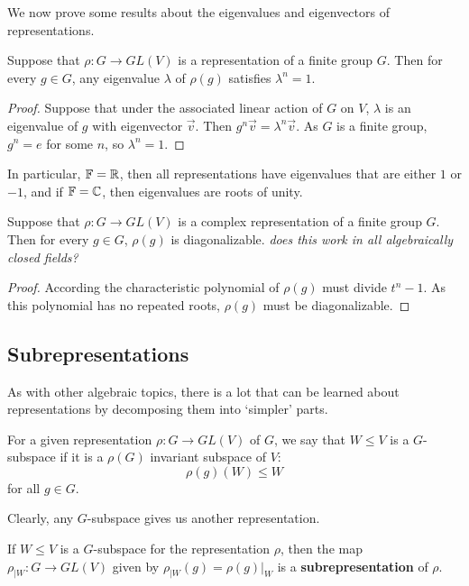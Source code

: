 \documentclass[a4paper]{article}
\begin{document}
We now prove some results about the eigenvalues and eigenvectors of representations.

\begin{lemma}
    Suppose that $\rho : G \to GL(V)$ is a representation of a finite group $G$. Then for every $g \in G$, any eigenvalue $\lambda$ of $\rho(g)$ satisfies $\lambda^n = 1$.
\end{lemma} 

\begin{proof}
    Suppose that under the associated linear action of $G$ on $V$, $\lambda$ is an eigenvalue of $g$ with eigenvector $\vec{v}$. Then $g^n\vec{v} = \lambda^n \vec{v}$. As $G$ is a finite group, $g^n = e$ for some $n$, so $\lambda^n = 1$.
\end{proof}
In particular, $\mathbb{F} = \mathbb{R}$, then all representations have eigenvalues that are either $1$ or $-1$, and if $\mathbb{F} = \mathbb{C}$, then eigenvalues are roots of unity.

\begin{cor}
    Suppose that $\rho : G \to GL(V)$ is a complex representation of a finite group $G$. Then for every $g \in G$, $\rho(g)$ is diagonalizable. \textit{does this work in all algebraically closed fields?} 
\end{cor} 

\begin{proof}
    According the characteristic polynomial of $\rho(g)$ must divide $t^n - 1$. As this polynomial has no repeated roots, $\rho(g)$ must be diagonalizable.
\end{proof}

\subsection{Subrepresentations}
As with other algebraic topics, there is a lot that can be learned about representations by decomposing them into `simpler' parts.

\begin{defi}[G-subspace]
    For a given representation $\rho: G \to GL(V)$ of $G$, we say that $W \leq V$ is a $G$-subspace if it is a $\rho(G)$ invariant subspace of $V$: $$\rho(g)(W) \leq W$$ for all $g \in G$.
\end{defi}

Clearly, any $G$-subspace gives us another representation.

\begin{defi}
    If $W \leq V$ is a $G$-subspace for the representation $\rho$, then the map $\rho_{|W}: G \to GL(V)$ given by $\rho_{|W}(g) = \rho(g)|_{W}$ is a \textbf{subrepresentation} of $\rho$.
\end{defi}
\end{document}
